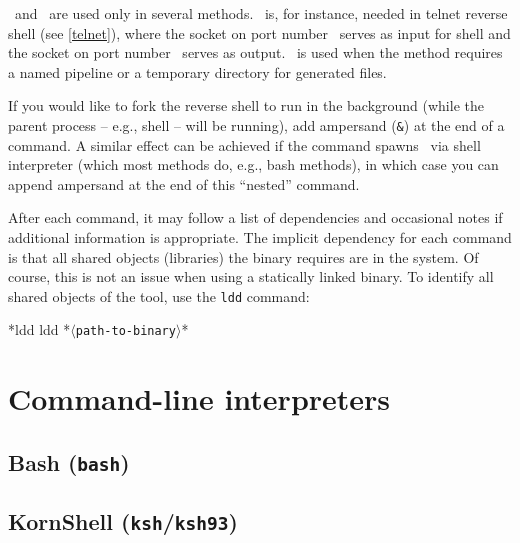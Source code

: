 \portt\ and \tmp\ are used only in several methods. \portt\ is, for instance, needed in telnet reverse shell (see \ref{telnet}), where the socket on port number \port\ serves as input for shell and the socket on port number \portt\ serves as output. \tmp\ is used when the method requires a named pipeline or a temporary directory for generated files.

If you would like to fork the reverse shell to run in the background (while the parent process -- e.g., shell -- will be running), add ampersand (\texttt{\&}) at the end of a command. A similar effect can be achieved if the command spawns \shell\ via shell interpreter (which most methods do, e.g., bash methods), in which case you can append ampersand at the end of this ``nested'' command.

After each command, it may follow a list of dependencies and occasional notes if additional information is appropriate. The implicit dependency for each command is that all shared objects (libraries) the binary requires are in the system. Of course, this is not an issue when using a statically linked binary. To identify all shared objects of the tool, use the \texttt{ldd} command:
\begin{cmdline}{*}{ldd}{}
ldd *\textcolor{placeholder}{\texttt{$\langle$path-to-binary$\rangle$}}*
\end{cmdline}

\section{Command-line interpreters}

\subsection{Bash (\texttt{bash})}






\subsection{KornShell (\texttt{ksh}/\texttt{ksh93})}


